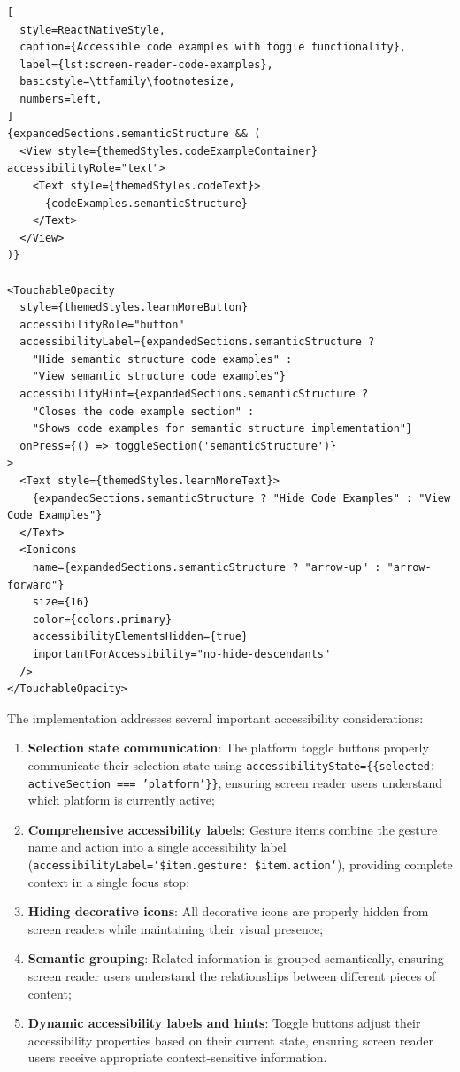 \begin{lstlisting}[
  style=ReactNativeStyle,
  caption={Accessible code examples with toggle functionality},
  label={lst:screen-reader-code-examples},
  basicstyle=\ttfamily\footnotesize,
  numbers=left,
]
{expandedSections.semanticStructure && (
  <View style={themedStyles.codeExampleContainer} accessibilityRole="text">
    <Text style={themedStyles.codeText}>
      {codeExamples.semanticStructure}
    </Text>
  </View>
)}

<TouchableOpacity
  style={themedStyles.learnMoreButton}
  accessibilityRole="button"
  accessibilityLabel={expandedSections.semanticStructure ? 
    "Hide semantic structure code examples" : 
    "View semantic structure code examples"}
  accessibilityHint={expandedSections.semanticStructure ? 
    "Closes the code example section" : 
    "Shows code examples for semantic structure implementation"}
  onPress={() => toggleSection('semanticStructure')}
>
  <Text style={themedStyles.learnMoreText}>
    {expandedSections.semanticStructure ? "Hide Code Examples" : "View Code Examples"}
  </Text>
  <Ionicons
    name={expandedSections.semanticStructure ? "arrow-up" : "arrow-forward"}
    size={16}
    color={colors.primary}
    accessibilityElementsHidden={true}
    importantForAccessibility="no-hide-descendants"
  />
</TouchableOpacity>
\end{lstlisting}
\FloatBarrier

The implementation addresses several important accessibility considerations:

\begin{enumerate}
    \item \textbf{Selection state communication}: The platform toggle buttons properly communicate their selection state using \texttt{accessibilityState=\{\{selected: activeSection === 'platform'\}\}}, ensuring screen reader users understand which platform is currently active;
    
    \item \textbf{Comprehensive accessibility labels}: Gesture items combine the gesture name and action into a single accessibility label (\texttt{accessibilityLabel=`\${item.gesture}: \${item.action}`}), providing complete context in a single focus stop;
    
    \item \textbf{Hiding decorative icons}: All decorative icons are properly hidden from screen readers while maintaining their visual presence;
    
    \item \textbf{Semantic grouping}: Related information is grouped semantically, ensuring screen reader users understand the relationships between different pieces of content;
    
    \item \textbf{Dynamic accessibility labels and hints}: Toggle buttons adjust their accessibility properties based on their current state, ensuring screen reader users receive appropriate context-sensitive information.
\end{enumerate}

